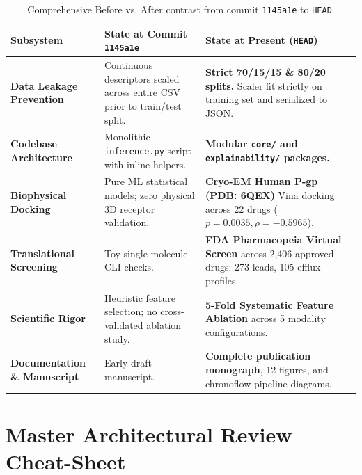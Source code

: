 \documentclass[11pt,a4paper]{article}
\begin{document}
\begin{table}[h!]
\centering
\small
\begin{tabularx}{\textwidth}{l p{5.5cm} X}
\toprule
\textbf{Subsystem} & \textbf{State at Commit \texttt{1145a1e}} & \textbf{State at Present (\texttt{HEAD})} \\
\midrule
\textbf{Data Leakage Prevention} & Continuous descriptors scaled across entire CSV prior to train/test split. & \textbf{Strict 70/15/15 \& 80/20 splits.} Scaler fit strictly on training set and serialized to JSON. \\
\textbf{Codebase Architecture} & Monolithic \texttt{inference.py} script with inline helpers. & \textbf{Modular \texttt{core/} and \texttt{explainability/} packages.} \\
\textbf{Biophysical Docking} & Pure ML statistical models; zero physical 3D receptor validation. & \textbf{Cryo-EM Human P-gp (PDB: 6QEX)} Vina docking across 22 drugs ($p=0.0035, \rho=-0.5965$). \\
\textbf{Translational Screening} & Toy single-molecule CLI checks. & \textbf{FDA Pharmacopeia Virtual Screen} across 2,406 approved drugs: 273 leads, 105 efflux profiles. \\
\textbf{Scientific Rigor} & Heuristic feature selection; no cross-validated ablation study. & \textbf{5-Fold Systematic Feature Ablation} across 5 modality configurations. \\
\textbf{Documentation \& Manuscript} & Early draft manuscript. & \textbf{Complete publication monograph}, 12 figures, and chronoflow pipeline diagrams. \\
\bottomrule
\end{tabularx}
\caption{Comprehensive Before vs. After contrast from commit \texttt{1145a1e} to \texttt{HEAD}.}
\end{table}

\newpage
\section{Master Architectural Review Cheat-Sheet}
\end{document}

